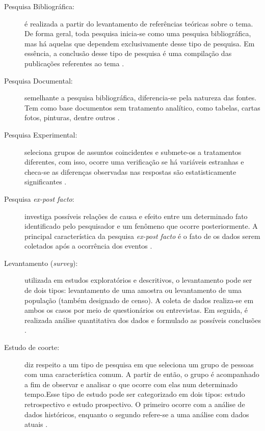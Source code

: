 \begin{description}
\item[Pesquisa Bibliográfica:] é realizada a partir do levantamento de referências teóricas sobre o tema. De forma geral, toda pesquisa inicia-se como uma pesquisa bibliográfica, mas há aquelas que dependem exclusivamente desse tipo de pesquisa. Em essência, a conclusão desse tipo de pesquisa é uma compilação das publicações referentes ao tema \cite{prodanov2013}.  

\item[Pesquisa Documental:] semelhante a pesquisa bibliográfica, diferencia-se pela natureza das fontes. Tem como base documentos sem tratamento analítico, como tabelas, cartas fotos, pinturas, dentre outros \cite{gil2002}. 

\item[Pesquisa Experimental:] seleciona grupos de assuntos coincidentes e submete-os a tratamentos diferentes, com isso, ocorre uma verificação se há variáveis estranhas e checa-se as diferenças observadas nas respostas são estatisticamente significantes \cite{tafner2007}.

\item[Pesquisa \textit{ex-post facto}:] investiga possíveis relações de causa e efeito entre um determinado fato identificado pelo pesquisador e um fenômeno que ocorre posteriormente. A principal característica da pesquisa \textit{ex-post facto} é o fato de os dados serem coletados após a ocorrência dos eventos \cite{gil2002}.

\item[Levantamento (\textit{survey}):] utilizada em estudos exploratórios e descritivos, o levantamento pode ser de dois tipos: levantamento de uma amostra ou levantamento de uma população (também designado de censo). A coleta de dados realiza-se em ambos os casos por meio de questionários ou entrevistas. Em seguida, é realizada análise quantitativa dos dados e formulado as possíveis conclusões \cite{prodanov2013}.

\item[Estudo de coorte:] diz respeito a um tipo de pesquisa em que seleciona um grupo de pessoas com uma característica comum. A partir de então, o grupo é acompanhado a fim de observar e analisar o que ocorre com elas num determinado tempo.Esse tipo de estudo pode ser categorizado em dois tipos: estudo retrospectivo e estudo prospectivo. O primeiro ocorre com a análise de dados históricos, enquanto o segundo refere-se a uma análise com dados atuais \cite{gil2002}.   


\end{description}

